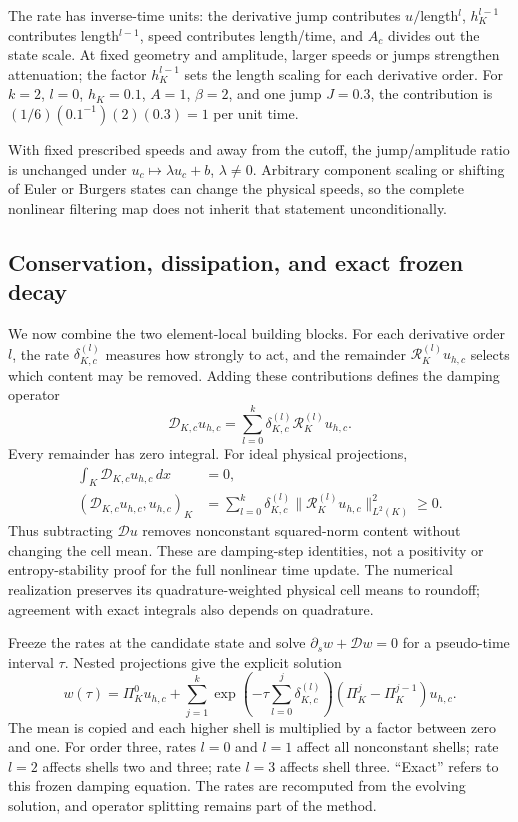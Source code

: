The rate has inverse-time units: the derivative jump contributes $u/$length$^l$,
$h_K^{l-1}$ contributes length$^{l-1}$, speed contributes length/time, and
$A_c$ divides out the state scale. At fixed geometry and amplitude, larger speeds or jumps strengthen
attenuation; the factor $h_K^{l-1}$ sets the length scaling for each derivative order. For $k=2$, $l=0$, $h_K=0.1$, $A=1$,
$\beta=2$, and one jump $J=0.3$, the contribution is
$(1/6)(0.1^{-1})(2)(0.3)=1$ per unit time.

With fixed prescribed speeds and away from the cutoff, the jump/amplitude
ratio is unchanged under $u_c\mapsto\lambda u_c+b$, $\lambda\ne0$.
Arbitrary component scaling or shifting of Euler or Burgers states can change
the physical speeds, so the complete nonlinear filtering map does not inherit
that statement unconditionally.

\subsection{Conservation, dissipation, and exact frozen decay}
\label{sec:ofdg-decay}
We now combine the two element-local building blocks. For each derivative
order $l$, the rate $\delta_{K,c}^{(l)}$ measures how strongly to act, and
the remainder $\mathcal R_K^{(l)}u_{h,c}$ selects which content may be
removed. Adding these contributions defines the damping operator
\begin{equation}
 \mathcal D_{K,c}u_{h,c}=\sum_{l=0}^k\delta_{K,c}^{(l)}
          \mathcal R_K^{(l)}u_{h,c}.
 \label{eq:ofdg-damping-operator}
\end{equation}
Every remainder has zero integral. For ideal physical projections,
\begin{align}
 \int_K\mathcal D_{K,c}u_{h,c}\,dx&=0,
 \label{eq:ofdg-local-conservation}\\
 (\mathcal D_{K,c}u_{h,c},u_{h,c})_K
 &=\sum_{l=0}^k\delta_{K,c}^{(l)}
       \|\mathcal R_K^{(l)}u_{h,c}\|_{L^2(K)}^2\geq0.
 \label{eq:ofdg-dissipation}
\end{align}
Thus subtracting $\mathcal D u$ removes nonconstant squared-norm content
without changing the cell mean. These are damping-step identities, not a
positivity or entropy-stability proof for the full nonlinear time update.
The numerical realization preserves its quadrature-weighted physical cell
means to roundoff; agreement with exact integrals also depends on quadrature.

Freeze the rates at the candidate state and solve
$\partial_s w+\mathcal D w=0$ for a pseudo-time interval $\tau$. Nested
projections give the explicit solution
\begin{equation}
 w(\tau)=\Pi_K^0u_{h,c}+\sum_{j=1}^k
  \exp\!\left(-\tau\sum_{l=0}^j\delta_{K,c}^{(l)}\right)
  (\Pi_K^j-\Pi_K^{j-1})u_{h,c}.
 \label{eq:ofdg-exact-decay}
\end{equation}
The mean is copied and each higher shell is multiplied by a factor between
zero and one. For order three, rates $l=0$ and $l=1$ affect all nonconstant
shells; rate $l=2$ affects shells two and three; rate $l=3$ affects shell three.
``Exact'' refers to this frozen damping equation. The rates are recomputed
from the evolving solution, and operator splitting remains part of the method.


